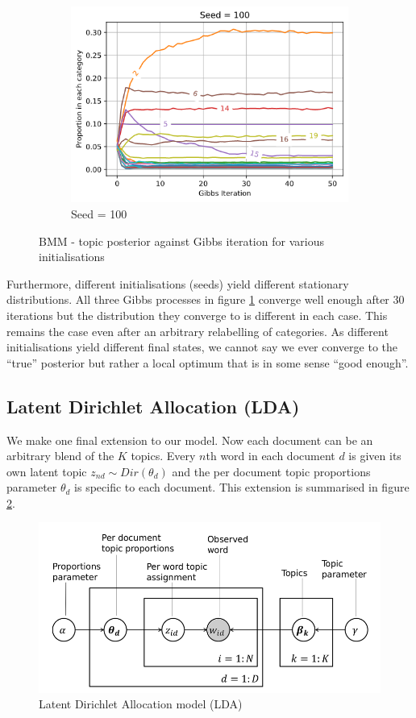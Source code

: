 \documentclass[]{article}
\begin{document}
\begin{figure}[!h]
\begin{subfigure}{0.33\linewidth}
		\centering
		\includegraphics[width=\linewidth]{gibbs-posterior-3.png}
		\caption{Seed = 100}	
	\end{subfigure}
	\caption{BMM - topic posterior against Gibbs iteration for various initialisations}
	\label{fig:bmm-post}
\end{figure}

Furthermore, different initialisations (seeds) yield different stationary distributions. All three Gibbs processes in figure \ref{fig:bmm-post} converge well enough after 30 iterations but the distribution they converge to is different in each case. This remains the case even after an arbitrary relabelling of categories. As different initialisations yield different final states, we cannot say we ever converge to the ``true'' posterior but rather a local optimum that is in some sense ``good enough''.

\clearpage
\subsection{Latent Dirichlet Allocation (LDA)}

We make one final extension to our model. Now each document can be an arbitrary blend of the $K$ topics. Every $n$th word in each document $d$ is given its own latent topic $z_{nd} \sim Dir(\theta_d)$ and the per document topic proportions parameter $\theta_d$ is specific to each document. This extension is summarised in figure \ref{fig:lda-model}.
%
\begin{figure}[!h]
	\centering
	\includegraphics[width=0.6\linewidth]{lda.png}
	\caption{Latent Dirichlet Allocation model (LDA)}
	\label{fig:lda-model}
\end{figure}
\end{document}

